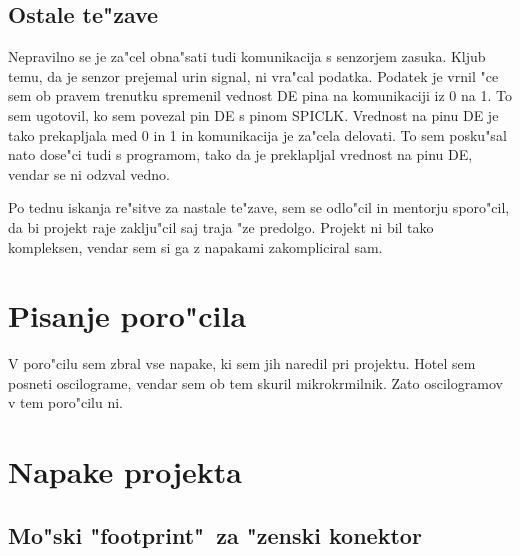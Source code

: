 \documentclass[a4paper]{article}
\begin{document}
\subsection{Ostale te"zave}
Nepravilno se je za"cel obna"sati tudi komunikacija s senzorjem zasuka. Kljub temu, da je senzor prejemal urin signal, ni vra"cal podatka. Podatek je vrnil "ce sem ob pravem trenutku spremenil vednost DE pina na komunikaciji iz 0 na 1. To sem ugotovil, ko sem povezal pin DE s pinom SPICLK. Vrednost na pinu DE je tako prekapljala med 0 in 1 in komunikacija je za"cela delovati. To sem posku"sal nato dose"ci tudi s programom, tako da je preklapljal vrednost na pinu DE, vendar se ni odzval vedno.

Po tednu iskanja re"sitve za nastale te"zave, sem se odlo"cil in mentorju sporo"cil, da bi projekt raje zaklju"cil saj traja "ze predolgo. Projekt ni bil tako kompleksen, vendar sem si ga z napakami zakompliciral sam.

\section{Pisanje poro"cila}

V poro"cilu sem zbral vse napake, ki sem jih naredil pri projektu. Hotel sem posneti oscilograme, vendar sem  ob tem skuril mikrokrmilnik. Zato oscilogramov v tem poro"cilu ni.





\section{Napake projekta}
	\subsection{Mo"ski "footprint"~za "zenski konektor}
	
\end{document}
